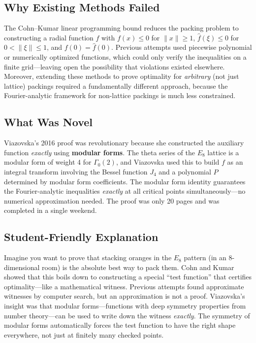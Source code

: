 \subsection{Why Existing Methods Failed}
The Cohn--Kumar linear programming bound reduces the packing problem to constructing a radial function $f$ with $f(x) \leq 0$ for $\|x\| \geq 1$, $\hat{f}(\xi) \leq 0$ for $0 < \|\xi\| \leq 1$, and $f(0) = \hat{f}(0)$. Previous attempts used piecewise polynomial or numerically optimized functions, which could only verify the inequalities on a finite grid---leaving open the possibility that violations existed elsewhere. Moreover, extending these methods to prove optimality for \emph{arbitrary} (not just lattice) packings required a fundamentally different approach, because the Fourier-analytic framework for non-lattice packings is much less constrained.

\subsection{What Was Novel}
Viazovska's 2016 proof was revolutionary because she constructed the auxiliary function \emph{exactly} using \textbf{modular forms}. The theta series of the $E_8$ lattice is a modular form of weight 4 for $\Gamma_0(2)$, and Viazovska used this to build $f$ as an integral transform involving the Bessel function $J_4$ and a polynomial $P$ determined by modular form coefficients. The modular form identity guarantees the Fourier-analytic inequalities \emph{exactly} at all critical points simultaneously---no numerical approximation needed. The proof was only 20 pages and was completed in a single weekend.

\subsection{Student-Friendly Explanation}
Imagine you want to prove that stacking oranges in the $E_8$ pattern (in an 8-dimensional room) is the absolute best way to pack them. Cohn and Kumar showed that this boils down to constructing a special ``test function'' that certifies optimality---like a mathematical witness. Previous attempts found approximate witnesses by computer search, but an approximation is not a proof. Viazovska's insight was that modular forms---functions with deep symmetry properties from number theory---can be used to write down the witness \emph{exactly}. The symmetry of modular forms automatically forces the test function to have the right shape everywhere, not just at finitely many checked points.

